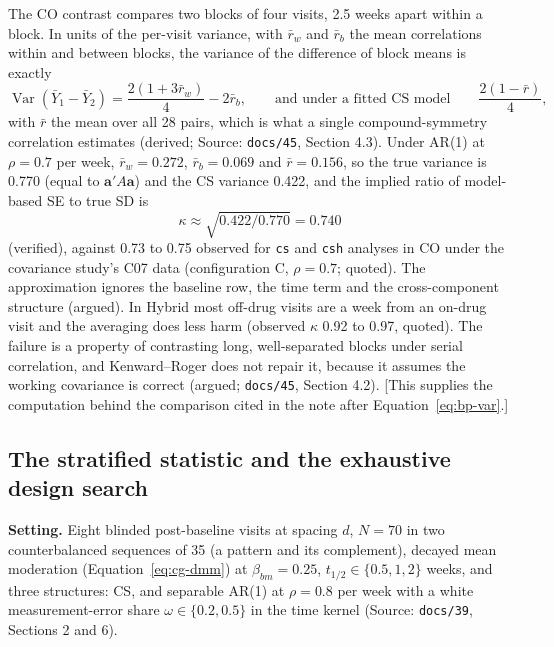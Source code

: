 \documentclass[11pt]{article}
\newcommand{\note}[1]{\textcolor{blue!60!black}{\small [#1]}}
\newcommand{\code}[1]{\texttt{#1}}
\begin{document}
The CO contrast compares two blocks of four visits, 2.5 weeks apart
within a block. In units of the per-visit variance, with $\bar r_w$ and
$\bar r_b$ the mean correlations within and between blocks, the variance
of the difference of block means is exactly
\begin{equation}
\operatorname{Var}(\bar Y_1 - \bar Y_2) = \frac{2(1 + 3\bar r_w)}{4}
  - 2\bar r_b ,
\qquad\text{and under a fitted CS model}\qquad
\frac{2(1 - \bar r)}{4},
\label{eq:invf-kappa}
\end{equation}
with $\bar r$ the mean over all 28 pairs, which is what a single
compound-symmetry correlation estimates (derived; Source: \code{docs/45},
Section 4.3). Under AR(1) at $\rho = 0.7$ per week, $\bar r_w = 0.272$,
$\bar r_b = 0.069$ and $\bar r = 0.156$, so the true variance is 0.770
(equal to $\mathbf a'A\mathbf a$) and the CS variance 0.422, and the
implied ratio of model-based SE to true SD is
\begin{equation}
\kappa \approx \sqrt{0.422/0.770} = 0.740
\label{eq:invf-kappa-val}
\end{equation}
(verified), against 0.73 to 0.75 observed for \code{cs} and \code{csh}
analyses in CO under the covariance study's C07 data (configuration C,
$\rho = 0.7$; quoted). The approximation ignores the
baseline row, the time term and the cross-component structure (argued).
In Hybrid most off-drug visits are a week from an on-drug visit and the
averaging does less harm (observed $\kappa$ 0.92 to 0.97, quoted). The
failure is a property of contrasting long, well-separated blocks under
serial correlation, and Kenward--Roger does not repair it, because it
assumes the working covariance is correct (argued; \code{docs/45},
Section 4.2). \note{This supplies the computation behind the comparison
cited in the note after Equation~\eqref{eq:bp-var}.}

\subsection{The stratified statistic and the exhaustive design search}
\label{sec:invf-search}

\textbf{Setting.} Eight blinded post-baseline visits at spacing $d$,
$N = 70$ in two counterbalanced sequences of 35 (a pattern and its
complement), decayed mean moderation (Equation~\eqref{eq:cg-dmm}) at
$\beta_{bm} = 0.25$, $t_{1/2} \in \{0.5, 1, 2\}$ weeks, and three
structures: CS, and separable AR(1) at $\rho = 0.8$ per week with a white
measurement-error share $\omega \in \{0.2, 0.5\}$ in the time kernel
(Source: \code{docs/39}, Sections 2 and 6).
\end{document}
